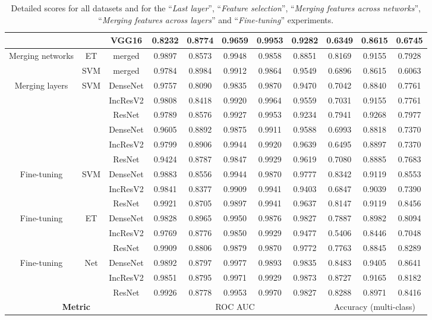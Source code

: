 \begin{table}
\begin{tabular}{|c|c|c|ccccc|ccc|}
    & & VGG16 & 0.8232 & 0.8774 & 0.9659 & 0.9953 & 0.9282 & 0.6349 & 0.8615 & 0.6745 \\
    \hline
    \multirow{2}{*}{Merging networks} & ET & merged & 0.9897 & 0.8573 & 0.9948 & 0.9858 & 0.8851 & 0.8169 & 0.9155 & 0.7928 \\
    & SVM & merged & 0.9784 & 0.8984 & 0.9912 & 0.9864 & 0.9549 & 0.6896 & 0.8615 & 0.6063 \\
    \hline
    \multirow{4}{*}{Merging layers} & \multirow{4}{*}{SVM} & DenseNet & 0.9757 & 0.8090 & 0.9835 & 0.9870 & 0.9470 & 0.7042 & 0.8840 & 0.7761 \\
    & & IncResV2 & 0.9808 & 0.8418 & 0.9920 & 0.9964 & 0.9559 & 0.7031 & 0.9155 & 0.7761 \\
    & & ResNet & 0.9789 & 0.8576 & 0.9927 & 0.9953 & 0.9234 & 0.7941 & 0.9268 & 0.7977 \\
    \hline
    \multirow{4}{*}{Merging layers} & \multirow{4}{*}{ET} & DenseNet & 0.9605 & 0.8892 & 0.9875 & 0.9911 & 0.9588 & 0.6993 & 0.8818 & 0.7370 \\
    & & IncResV2 & 0.9799 & 0.8906 & 0.9944 & 0.9920 & 0.9639 & 0.6495 & 0.8897 & 0.7370 \\
    & & ResNet & 0.9424 & 0.8787 & 0.9847 & 0.9929 & 0.9619 & 0.7080 & 0.8885 & 0.7683 \\
    \hline
    \multirow{3}{*}{Fine-tuning} & \multirow{3}{*}{SVM} & DenseNet & 0.9883 & 0.8556 & 0.9944 & 0.9870 & 0.9777 & 0.8342 & 0.9119 & 0.8553 \\
    & & IncResV2 & 0.9841 & 0.8377 & 0.9909 & 0.9941 & 0.9403 & 0.6847 & 0.9039 & 0.7390 \\
    & & ResNet & 0.9921 & 0.8705 & 0.9897 & 0.9941 & 0.9637 & 0.8147 & 0.9119 & 0.8456 \\
    \hline
    \multirow{3}{*}{Fine-tuning} & \multirow{3}{*}{ET} & DenseNet & 0.9828 & 0.8965 & 0.9950 & 0.9876 & 0.9827 & 0.7887 & 0.8982 & 0.8094 \\
    & & IncResV2 & 0.9769 & 0.8776 & 0.9850 & 0.9929 & 0.9477 & 0.5406 & 0.8446 & 0.7048 \\
    & & ResNet & 0.9909 & 0.8806 & 0.9879 & 0.9870 & 0.9772 & 0.7763 & 0.8845 & 0.8289 \\
    \hline
    \multirow{3}{*}{Fine-tuning} & \multirow{3}{*}{Net} & DenseNet & 0.9892 & 0.8797 & 0.9977 & 0.9893 & 0.9835 & 0.8483 & 0.9405 & 0.8641 \\
    & & IncResV2 & 0.9851 & 0.8795 & 0.9971 & 0.9929 & 0.9873 & 0.8727 & 0.9165 & 0.8182 \\
    & & ResNet & 0.9926 & 0.8778 & 0.9953 & 0.9970 & 0.9827 & 0.8288 & 0.8971 & 0.8416 \\
    \hline
    \multicolumn{3}{|c|}{\textbf{Metric}} & \multicolumn{5}{c|}{ROC AUC} & \multicolumn{3}{c|}{Accuracy (multi-class)} \\
    \hline
  \end{tabular}
  \caption{Detailed scores for all datasets and for the ``\textit{Last layer}'', ``\textit{Feature selection}'', ``\textit{Merging features across networks}'', ``\textit{Merging features across layers}'' and ``\textit{Fine-tuning}'' experiments.}
  \label{app:comp:tab:detailed_first}
\end{table}

